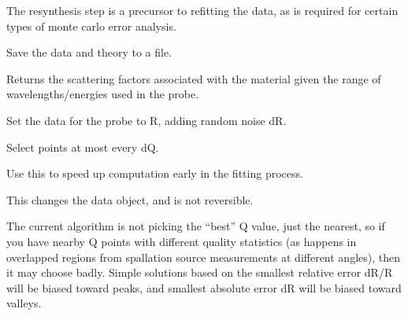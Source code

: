 \documentclass[letterpaper,10pt,english]{sphinxmanual}
\begin{document}
\begin{fulllineitems}
\begin{fulllineitems}
The resynthesis step is a precursor to refitting the data, as is
required for certain types of monte carlo error analysis.

\end{fulllineitems}


\begin{fulllineitems}
\label{api/probe:refl1d.probe.QProbe.save}
Save the data and theory to a file.

\end{fulllineitems}


\begin{fulllineitems}
\label{api/probe:refl1d.probe.QProbe.scattering_factors}
Returns the scattering factors associated with the material given
the range of wavelengths/energies used in the probe.

\end{fulllineitems}


\begin{fulllineitems}
\label{api/probe:refl1d.probe.QProbe.simulate_data}
Set the data for the probe to R, adding random noise dR.

\end{fulllineitems}


\begin{fulllineitems}
\label{api/probe:refl1d.probe.QProbe.subsample}
Select points at most every dQ.

Use this to speed up computation early in the fitting process.

This changes the data object, and is not reversible.

The current algorithm is not picking the ``best'' Q value, just the
nearest, so if you have nearby Q points with different quality
statistics (as happens in overlapped regions from spallation
source measurements at different angles), then it may choose
badly.  Simple solutions based on the smallest relative error dR/R
will be biased toward peaks, and smallest absolute error dR will
be biased toward valleys.


\end{fulllineitems}
\end{fulllineitems}
\end{document}

